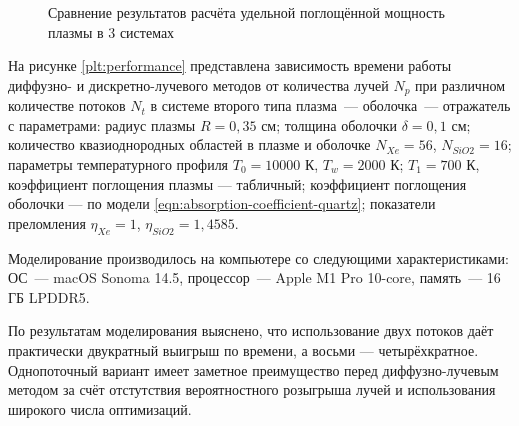 \begin{figure}[ht]
	\noindent{}
	\captionsetup{justification=centering}
	\caption{Сравнение результатов расчёта удельной поглощённой мощность плазмы в 3 системах}
	\label{plt:compare}
\end{figure}

На рисунке \ref{plt:performance} представлена зависимость времени работы диффузно- и дискретно-лучевого методов от количества лучей $N_p$ при различном количестве потоков $N_t$ в системе второго типа плазма~— оболочка~— отражатель с параметрами: радиус плазмы $R = 0,35$ см; толщина оболочки $\delta = 0,1$ см; количество квазиоднородных областей в плазме и оболочке $N_{Xe} = 56$, $N_{SiO2} = 16$; параметры температурного профиля $T_0 = 10000$ К, $T_w = 2000$ К; $T_1 = 700$ К, коэффициент поглощения плазмы — табличный; коэффициент поглощения оболочки — по модели \eqref{eqn:absorption-coefficient-quartz}; показатели преломления $\eta_{Xe} = 1$, $\eta_{SiO2} = 1,4585$.

Моделирование производилось на компьютере со следующими характеристиками: ОС~— macOS Sonoma 14.5, процессор~— Apple M1 Pro 10-core, память~— 16 ГБ LPDDR5.

По результатам моделирования выяснено, что использование двух потоков даёт практически двукратный выигрыш по времени, а восьми — четырёхкратное.
Однопоточный вариант имеет заметное преимущество перед диффузно-лучевым методом за счёт отстутствия вероятностного розыгрыша лучей и использования широкого числа оптимизаций.

